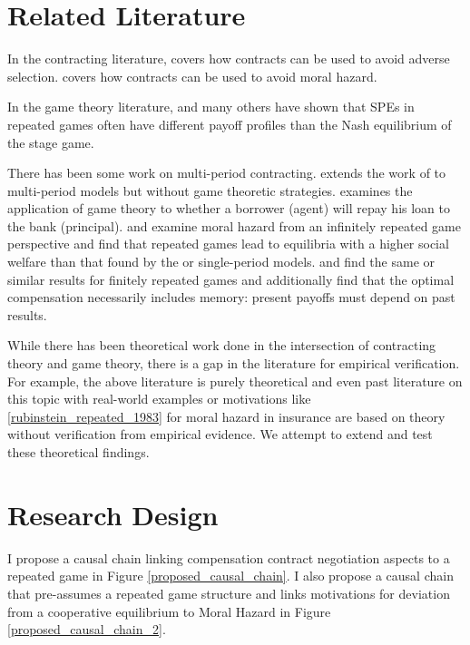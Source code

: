 \documentclass{article}
\begin{document}
\section{Related Literature}
\par In the contracting literature, \cite{besterRationing} covers how contracts can be used to avoid adverse selection. \cite{holmstrom} covers how contracts can be used to avoid moral hazard.
\par In the game theory literature, \cite{repeatedGames} and many others have shown that SPEs in repeated games often have different payoff profiles than the Nash equilibrium of the stage game.
\par There has been some work on multi-period contracting. \cite{holstromMulti} extends the work of \cite{holmstrom} to multi-period models but without game theoretic strategies. \cite{gameTheoryLoan} examines the application of game theory to whether a borrower (agent) will repay his loan to the bank (principal). \cite{infiniteHazard} and \cite{repeatedHazard} examine moral hazard from an infinitely repeated game perspective and find that repeated games lead to equilibria with a higher social welfare than that found by the \cite{holmstrom} or \cite{besterRationing} single-period models. \cite{lambert_long-term_1983} and \cite{radner_monitoring_1981} find the same or similar results for finitely repeated games and additionally find that the optimal compensation necessarily includes memory: present payoffs must depend on past results. 
\par While there has been theoretical work done in the intersection of contracting theory and game theory, there is a gap in the literature for empirical verification. For example, the above literature is purely theoretical and even past literature on this topic with real-world examples or motivations like \ref{rubinstein_repeated_1983} for moral hazard in insurance are based on theory without verification from empirical evidence. We attempt to extend and test these theoretical findings.

\section{Research Design}
I propose a causal chain linking compensation contract negotiation aspects to a repeated game in Figure \ref{proposed_causal_chain}. I also propose a causal chain that pre-assumes a repeated game structure and links motivations for deviation from a cooperative equilibrium to Moral Hazard in Figure \ref{proposed_causal_chain_2}.
\end{document}
